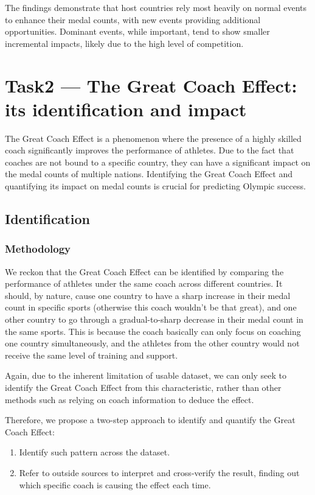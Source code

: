 \documentclass{mcmthesis}
\begin{document}
The findings demonstrate that host countries rely most heavily on normal events to enhance their medal counts, with new events providing additional opportunities. Dominant events, while important, tend to show smaller incremental impacts, likely due to the high level of competition.


\section{Task2 --- The Great Coach Effect: its identification and impact}

The Great Coach Effect is a phenomenon where the presence of a highly skilled coach significantly improves the performance of athletes. Due to the fact that coaches are not bound to a specific country, they can have a significant impact on the medal counts of multiple nations. Identifying the Great Coach Effect and quantifying its impact on medal counts is crucial for predicting Olympic success.

\subsection{Identification}

\subsubsection{Methodology}

We reckon that the Great Coach Effect can be identified by comparing the performance of athletes under the same coach across different countries. It should, by nature, cause one country to have a sharp increase in their medal count in specific sports (otherwise this coach wouldn't be that great), and one other country to go through a gradual-to-sharp decrease in their medal count in the same sports. This is because the coach basically can only focus on coaching one country simultaneously, and the athletes from the other country would not receive the same level of training and support.

Again, due to the inherent limitation of usable dataset, we can only seek to identify the Great Coach Effect from this characteristic, rather than other methods such as relying on coach information to deduce the effect.

Therefore, we propose a two-step approach to identify and quantify the Great Coach Effect:

\begin{enumerate}
    \item Identify such pattern across the dataset.
    \item Refer to outside sources to interpret and cross-verify the result, finding out which specific coach is causing the effect each time.
\end{enumerate}
\end{document}
